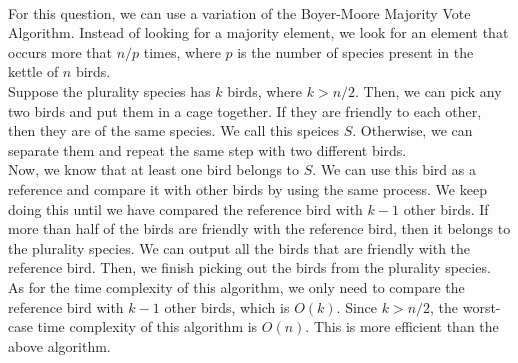 \documentclass[12pt,a4paper]{article}
\newcommand{\question}[1]{\bigskip\noindent{\textbf{Q{#1} solution}}}
\begin{document}
\question{15.B}
\\For this question, we can use a variation of the Boyer-Moore Majority Vote Algorithm. Instead of looking for a majority element, we look for an element that occurs more that $n/p$ times,
where $p$ is the number of species present in the kettle of $n$ birds.
\\Suppose the plurality species has $k$ birds, where $k>n/2$. Then, we can pick any two birds and put them in a cage together. If they are friendly to each other, then they are of the same species.
We call this speices $S$. Otherwise, we can separate them and repeat the same step with two different birds. 
\\Now, we know that at least one bird belongs to $S$. We can use this bird as a reference and compare it with other birds by using the same process. We keep doing this until we have 
compared the reference bird with $k-1$ other birds. If more than half of the birds are friendly with the reference bird, then it belongs to the plurality species. We can output all the birds that 
are friendly with the reference bird. Then, we finish picking out the birds from the plurality species.
\\As for the time complexity of this algorithm, we only need to compare the reference bird with $k-1$ other birds, which is $O(k)$. Since $k>n/2$, the worst-case time complexity of this algorithm is
$O(n)$. This is more efficient than the above algorithm.
\end{document}
